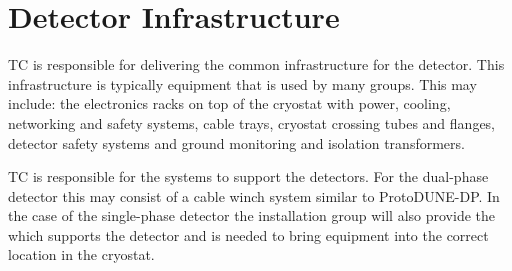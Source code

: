 \section{Detector Infrastructure}
\label{sec:fdsp-coord-infrastructure}

TC is responsible for delivering the common infrastructure for the
detector. This infrastructure is typically equipment that is used by
many groups. This may include: the electronics racks on top of the
cryostat with power, cooling, networking and safety systems, cable
trays, cryostat crossing tubes and flanges, detector safety systems
and ground monitoring and isolation transformers.

TC is responsible for the systems to support the detectors. For the
dual-phase detector this may consist of a cable winch system similar
to ProtoDUNE-DP.  In the case of the single-phase detector the
installation group will also provide the  which supports
the detector and is needed to bring equipment into the correct
location in the cryostat.
